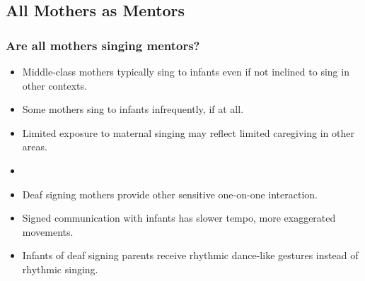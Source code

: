 \documentclass{beamer}
\begin{document}
\subsection*{All Mothers as Mentors}
\begin{frame}
	\frametitle{Are all mothers singing mentors?}
	\begin{itemize}
		\item Middle-class mothers typically sing to infants even if not inclined to sing in other contexts.\\
		\item Some mothers sing to infants infrequently, if at all.\\
		\item Limited exposure to maternal singing may reflect limited caregiving in other areas.\\
		\item \pause %
		\item Deaf signing mothers provide other sensitive one-on-one interaction.\\
		\item Signed communication with infants has slower tempo, more exaggerated movements.\\
		\item Infants of deaf signing parents receive rhythmic dance-like gestures instead of rhythmic singing.\\
	\end{itemize}
\end{frame}
\end{document}
